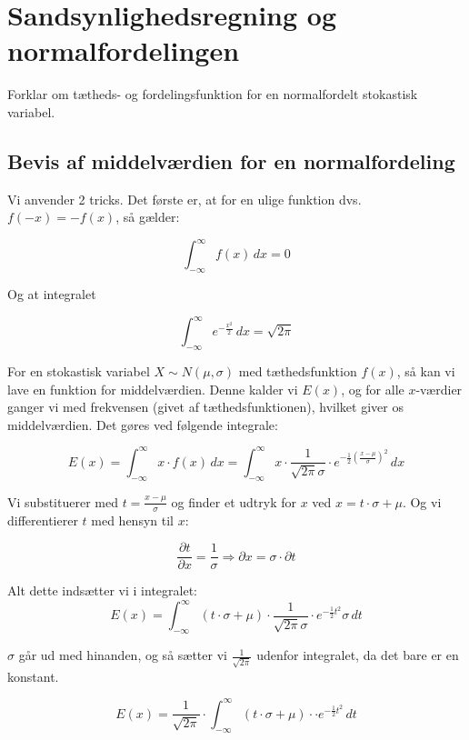 
\section{Sandsynlighedsregning og normalfordelingen}

Forklar om tætheds- og fordelingsfunktion for en normalfordelt stokastisk variabel.

\subsection{Bevis af middelværdien for en normalfordeling}

\begin{proofw}
    
Vi anvender 2 tricks.
Det første er, at for en ulige funktion dvs. $f(-x)=-f(x)$, så gælder:

$$
    \int_{-\infty}^{\infty} f(x) \,dx=0
$$

Og at integralet

$$
    \int_{-\infty}^{\infty} e^{
        -\frac{x^2}{2}
    }\,dx = \sqrt{2\pi}
$$

For en stokastisk variabel $X \sim N(\mu, \sigma)$
med tæthedsfunktion $f(x)$, så kan vi lave en funktion for middelværdien.
Denne kalder vi $E(x)$, og for alle $x$-værdier ganger vi med frekvensen (givet af tæthedsfunktionen),
hvilket giver os middelværdien. Det gøres ved følgende integrale:

$$
    E(x)= \int_{-\infty}^{\infty}
    x \cdot f(x) \,dx
    =
     \int_{-\infty}^{\infty}
    x \cdot \frac{1}{\sqrt{2\pi} \sigma}
    \cdot e^{
        -\frac{1}{2} (\frac{x-\mu}{\sigma})^2
    }
    \,dx
$$

Vi substituerer med $t=\frac{x-\mu}{\sigma}$ og finder et udtryk for
$x$ ved $x=t \cdot \sigma + \mu$. Og vi differentierer $t$ med hensyn til $x$:

$$
    \frac{\partial t}{\partial x}=\frac{1}{\sigma} \Rightarrow \partial x = \sigma \cdot \partial t
$$

Alt dette indsætter vi i integralet:
$$
 E(x)=\int_{-\infty}^{\infty}
    (t \cdot \sigma + \mu) \cdot \frac{1}{\sqrt{2\pi} \sigma}
    \cdot e^{
        -\frac{1}{2} t^2
    }
    \sigma \,dt
$$

$\sigma$ går ud med hinanden, og så sætter vi $\frac{1}{\sqrt{2 \pi}}$ udenfor
integralet, da det bare er en konstant.

$$
E(x)=\frac{1}{\sqrt{2\pi}} \cdot
\int_{-\infty}^{\infty}
    (t \cdot \sigma + \mu) \cdot
    \cdot e^{
        -\frac{1}{2} t^2
    }
    \,dt
$$


\end{proofw}
